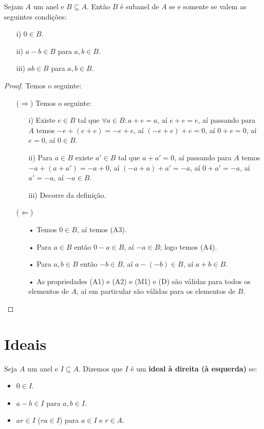 \documentclass[11pt,twoside,a4paper]{book}
\begin{document}
\begin{proposicao}
Sejam $A$ um anel e $B\subseteq A$. Então $B$ é subanel de $A$ se e somente se valem as seguintes condições:
\begin{itemize}
\item[i)] $0\in B$.
\item[ii)] $a-b\in B$ para $a,b\in B$.
\item[iii)] $ab\in B$ para $a,b\in B$.
\end{itemize}
\end{proposicao}
\begin{proof}
Temos o seguinte:
\begin{itemize}
\item[($\Rightarrow$)] Temos o seguinte:
\begin{itemize}
\item[i)] Existe $e\in B$ tal que $\forall a\in B:a+e=a$, aí $e+e=e$, aí passando para $A$ temos $-e+(e+e)=-e+e$, aí $(-e+e)+e=0$, aí $0+e=0$, aí $e=0$, aí $0\in B$.
\item[ii)] Para $a\in B$ existe $a'\in B$ tal que $a+a'=0$, aí passando para $A$ temos $-a+(a+a')=-a+0$, aí $(-a+a)+a'=-a$, aí $0+a'=-a$, aí $a'=-a$, aí $-a\in B$.
\item[iii)] Decorre da definição.
\end{itemize}
\item[($\Leftarrow$)]
\begin{itemize}
\item[•] Temos $0\in B$, aí temos (A3).
\item[•] Para $a\in B$ então $0-a\in B$, aí $-a\in B$; logo temos (A4).
\item[•] Para $a,b\in B$ então $-b\in B$, aí $a-(-b)\in B$, aí $a+b\in B$.
\item[•] As propriedades (A1) e (A2) e (M1) e (D) são válidas para todos os elementos de $A$, aí em particular são válidas para os elementos de $B$.
\end{itemize}

\end{itemize}
\end{proof}

\newpage

\section{Ideais}

\begin{definicao}
Seja $A$ um anel e $I\subseteq A$. Dizemos que $I$ é um \textbf{ideal à direita (à esquerda)} se:
\begin{itemize}
\item $0\in I$.
\item $a-b\in I$ para $a,b\in I$.
\item $ar\in I$ ($ra\in I$) para $a\in I$ e $r\in A$.
\end{itemize}
\end{definicao}
\end{document}
